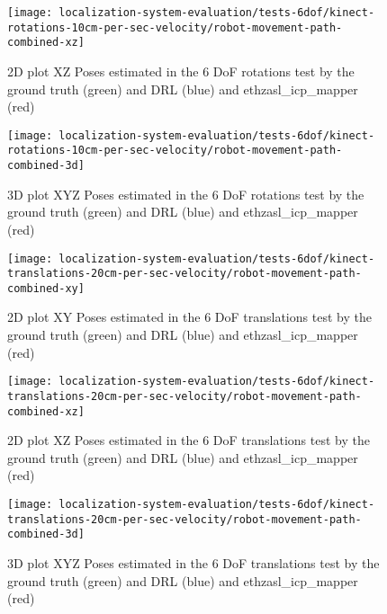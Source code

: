 \begin{figure}[H]
	\centering
	\hspace*{0.25cm}\texttt{[image: localization-system-evaluation/tests-6dof/kinect-rotations-10cm-per-sec-velocity/robot-movement-path-combined-xz]}
	\caption{2D plot XZ Poses estimated in the 6 DoF rotations test by the ground truth (green) and DRL (blue) and ethzasl\_icp\_mapper (red)}
	\label{fig:localization-system-evaluation_kinect-rotations-robot-movement-path-combined-xz}
\end{figure}

\begin{figure}[H]
	\centering
	\texttt{[image: localization-system-evaluation/tests-6dof/kinect-rotations-10cm-per-sec-velocity/robot-movement-path-combined-3d]}
	\caption{3D plot XYZ Poses estimated in the 6 DoF rotations test by the ground truth (green) and DRL (blue) and ethzasl\_icp\_mapper (red)}
	\label{fig:localization-system-evaluation_kinect-rotations-robot-movement-path-combined-3d}
\end{figure}


\begin{figure}[H]
	\centering
	\texttt{[image: localization-system-evaluation/tests-6dof/kinect-translations-20cm-per-sec-velocity/robot-movement-path-combined-xy]}
	\caption{2D plot XY Poses estimated in the 6 DoF translations test by the ground truth (green) and DRL (blue) and ethzasl\_icp\_mapper (red)}
	\label{fig:localization-system-evaluation_kinect-translations-robot-movement-path-combined-xy}
\end{figure}

\begin{figure}[H]
	\centering
	\hspace*{0.25cm}\texttt{[image: localization-system-evaluation/tests-6dof/kinect-translations-20cm-per-sec-velocity/robot-movement-path-combined-xz]}
	\caption{2D plot XZ Poses estimated in the 6 DoF translations test by the ground truth (green) and DRL (blue) and ethzasl\_icp\_mapper (red)}
	\label{fig:localization-system-evaluation_kinect-translations-robot-movement-path-combined-xz}
\end{figure}

\begin{figure}[H]
	\centering
	\texttt{[image: localization-system-evaluation/tests-6dof/kinect-translations-20cm-per-sec-velocity/robot-movement-path-combined-3d]}
	\caption{3D plot XYZ Poses estimated in the 6 DoF translations test by the ground truth (green) and DRL (blue) and ethzasl\_icp\_mapper (red)}
	\label{fig:localization-system-evaluation_kinect-translations-robot-movement-path-combined-3d}
\end{figure}

